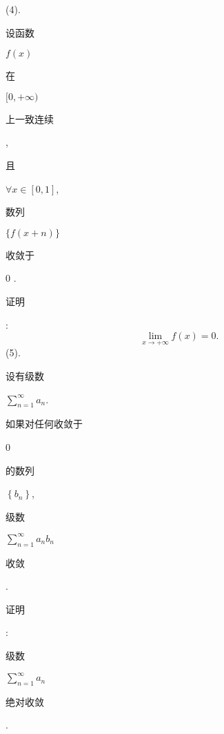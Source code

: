\documentclass[10pt]{article}
\begin{document}
(4). \begin{CJK}{UTF8}{mj}设函数\end{CJK} $f(x)$ \begin{CJK}{UTF8}{mj}在\end{CJK} $[0,+\infty)$ \begin{CJK}{UTF8}{mj}上一致连续\end{CJK}, \begin{CJK}{UTF8}{mj}且\end{CJK} $\forall x \in[0,1]$, \begin{CJK}{UTF8}{mj}数列\end{CJK} $\{f(x+n)\}$ \begin{CJK}{UTF8}{mj}收敛于\end{CJK} 0 . \begin{CJK}{UTF8}{mj}证明\end{CJK}:
$$
\lim _{x \rightarrow+\infty} f(x)=0 .
$$
(5). \begin{CJK}{UTF8}{mj}设有级数\end{CJK} $\sum_{n=1}^{\infty} a_{n}$. \begin{CJK}{UTF8}{mj}如果对任何收敛于\end{CJK} 0 \begin{CJK}{UTF8}{mj}的数列\end{CJK} $\left\{b_{n}\right\}$, \begin{CJK}{UTF8}{mj}级数\end{CJK} $\sum_{n=1}^{\infty} a_{n} b_{n}$ \begin{CJK}{UTF8}{mj}收敛\end{CJK}. \begin{CJK}{UTF8}{mj}证明\end{CJK}: \begin{CJK}{UTF8}{mj}级数\end{CJK} $\sum_{n=1}^{\infty} a_{n}$ \begin{CJK}{UTF8}{mj}绝对收敛\end{CJK}.
\end{document}
